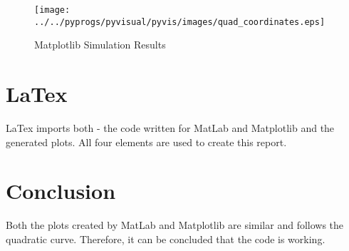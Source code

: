 \documentclass{article}
\begin{document}
\begin{figure}[h]
    \centering
        \texttt{[image: ../../pyprogs/pyvisual/pyvis/images/quad\_coordinates.eps]} 
    \caption{Matplotlib Simulation Results}
    \label{fig:matplotlibfigure}
\end{figure}

\section{LaTex}
LaTex imports both - the code written for MatLab and Matplotlib and the generated plots. All four elements are used to create this report.

\section{Conclusion}
Both the plots created by MatLab and Matplotlib are similar and follows the quadratic curve. Therefore, it can be concluded that the code is working. 

 

\end{document}
